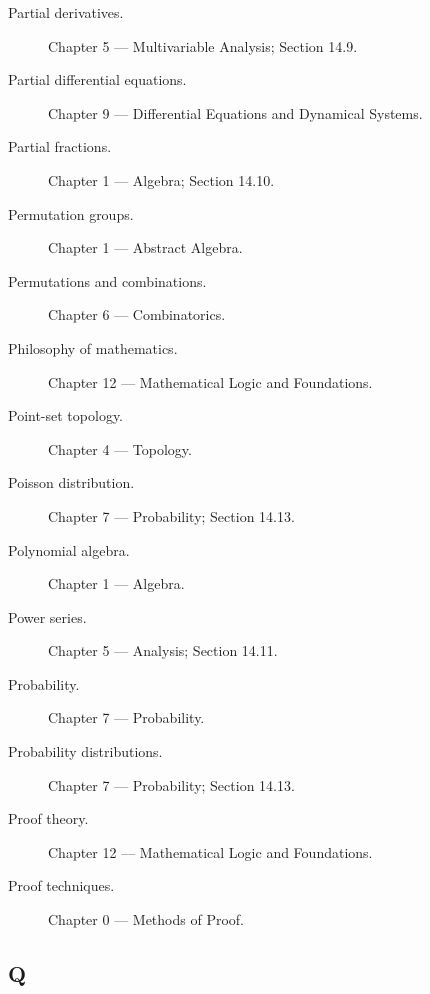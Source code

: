 \begin{description}

\item[Partial derivatives.]
Chapter 5 --- Multivariable Analysis;
Section 14.9.

\item[Partial differential equations.]
Chapter 9 --- Differential Equations and Dynamical Systems.

\item[Partial fractions.]
Chapter 1 --- Algebra;
Section 14.10.

\item[Permutation groups.]
Chapter 1 --- Abstract Algebra.

\item[Permutations and combinations.]
Chapter 6 --- Combinatorics.

\item[Philosophy of mathematics.]
Chapter 12 --- Mathematical Logic and Foundations.

\item[Point-set topology.]
Chapter 4 --- Topology.

\item[Poisson distribution.]
Chapter 7 --- Probability;
Section 14.13.

\item[Polynomial algebra.]
Chapter 1 --- Algebra.

\item[Power series.]
Chapter 5 --- Analysis;
Section 14.11.

\item[Probability.]
Chapter 7 --- Probability.

\item[Probability distributions.]
Chapter 7 --- Probability;
Section 14.13.

\item[Proof theory.]
Chapter 12 --- Mathematical Logic and Foundations.

\item[Proof techniques.]
Chapter 0 --- Methods of Proof.

\end{description}

\subsection*{Q}

